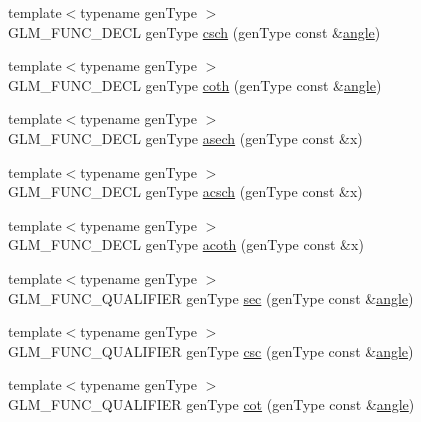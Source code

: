 \begin{DoxyCompactItemize}
\item 
{\footnotesize template$<$typename gen\+Type $>$ }\\G\+L\+M\+\_\+\+F\+U\+N\+C\+\_\+\+D\+E\+CL gen\+Type \hyperlink{group__gtc__reciprocal_ga00404a9cdf62023792d1d0afedd7f896}{csch} (gen\+Type const \&\hyperlink{group__gtc__quaternion_ga23a3fc7ada5bbb665ff84c92c6e0542c}{angle})
\item 
{\footnotesize template$<$typename gen\+Type $>$ }\\G\+L\+M\+\_\+\+F\+U\+N\+C\+\_\+\+D\+E\+CL gen\+Type \hyperlink{group__gtc__reciprocal_gae2f1e6f7c360dda452b88e0c492d6f4d}{coth} (gen\+Type const \&\hyperlink{group__gtc__quaternion_ga23a3fc7ada5bbb665ff84c92c6e0542c}{angle})
\item 
{\footnotesize template$<$typename gen\+Type $>$ }\\G\+L\+M\+\_\+\+F\+U\+N\+C\+\_\+\+D\+E\+CL gen\+Type \hyperlink{group__gtc__reciprocal_ga450f3bf1c04751198994d26d92ac2a63}{asech} (gen\+Type const \&x)
\item 
{\footnotesize template$<$typename gen\+Type $>$ }\\G\+L\+M\+\_\+\+F\+U\+N\+C\+\_\+\+D\+E\+CL gen\+Type \hyperlink{group__gtc__reciprocal_ga418b31539e1a69c262712f2c7a4f27eb}{acsch} (gen\+Type const \&x)
\item 
{\footnotesize template$<$typename gen\+Type $>$ }\\G\+L\+M\+\_\+\+F\+U\+N\+C\+\_\+\+D\+E\+CL gen\+Type \hyperlink{group__gtc__reciprocal_gad73911994e6bb6a06cc3ea1bd89201ab}{acoth} (gen\+Type const \&x)
\item 
{\footnotesize template$<$typename gen\+Type $>$ }\\G\+L\+M\+\_\+\+F\+U\+N\+C\+\_\+\+Q\+U\+A\+L\+I\+F\+I\+ER gen\+Type \hyperlink{group__gtc__reciprocal_gabb6829a472da1cc94d88afa6396bed1f}{sec} (gen\+Type const \&\hyperlink{group__gtc__quaternion_ga23a3fc7ada5bbb665ff84c92c6e0542c}{angle})
\item 
{\footnotesize template$<$typename gen\+Type $>$ }\\G\+L\+M\+\_\+\+F\+U\+N\+C\+\_\+\+Q\+U\+A\+L\+I\+F\+I\+ER gen\+Type \hyperlink{group__gtc__reciprocal_ga5df75de99f63e854087a06f538907b2c}{csc} (gen\+Type const \&\hyperlink{group__gtc__quaternion_ga23a3fc7ada5bbb665ff84c92c6e0542c}{angle})
\item 
{\footnotesize template$<$typename gen\+Type $>$ }\\G\+L\+M\+\_\+\+F\+U\+N\+C\+\_\+\+Q\+U\+A\+L\+I\+F\+I\+ER gen\+Type \hyperlink{group__gtc__reciprocal_ga2f49e28c2634ae1a212e2fc38c42ad42}{cot} (gen\+Type const \&\hyperlink{group__gtc__quaternion_ga23a3fc7ada5bbb665ff84c92c6e0542c}{angle})

\end{DoxyCompactItemize}
